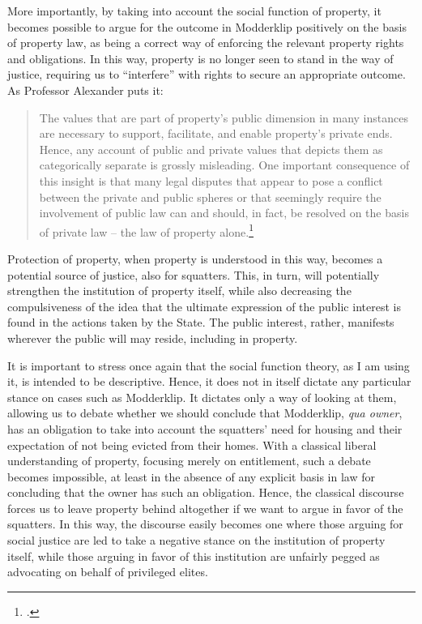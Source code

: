 More importantly, by taking into account the social function of property, it becomes possible to argue for the outcome in Modderklip positively on the basis of property law, as being a correct way of enforcing the relevant property rights and obligations. In this way, property is no longer seen to stand in the way of justice, requiring us to ``interfere'' with rights to secure an appropriate outcome. As Professor Alexander puts it: 
\begin{quote} The values that are
part of property's public dimension in many instances are necessary
to support, facilitate, and enable property's private ends.
Hence, any account of public and private values that depicts them as categorically
separate is grossly misleading. One important consequence of this
insight is that many legal disputes that appear to pose a conflict between
the private and public spheres or that seemingly
require the involvement of public law can and
should, in fact, be resolved on the basis of private law -- the law
of property alone.\footcite[1295-1296]{alexander14} \end{quote}
Protection of property, when property is understood in this way, becomes a potential source of justice, also for squatters. This, in turn, will potentially strengthen the institution of property itself, while also decreasing the compulsiveness of the idea that the ultimate expression of the public interest is found in the actions taken by the State. The public interest, rather, manifests wherever the public will may reside, including in property.

It is important to stress once again that the social function theory, as I am using it, is intended to be descriptive. Hence, it does not in itself dictate any particular stance on cases such as Modderklip. It dictates only a way of looking at them, allowing us to debate whether we should conclude that Modderklip, {\it qua owner}, has an obligation to take into account the squatters' need for housing and their expectation of not being evicted from their homes. With a classical liberal understanding of property, focusing merely on entitlement, such a debate becomes impossible, at least in the absence of any explicit basis in law for concluding that the owner has such an obligation. Hence, the classical discourse forces us to leave property behind altogether if we want to argue in favor of the squatters. In this way, the discourse easily becomes one where those arguing for social justice are led to take a negative stance on the institution of property itself, while those arguing in favor of this institution are unfairly pegged as advocating on behalf of privileged elites.

